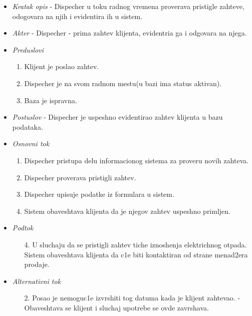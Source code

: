 \documentclass[10 pt]{article}
\begin{document}
		\begin{itemize}
			\item\textit{Kratak opis} - Dispecher u toku radnog vremena proverava pristigle zahteve, odogovara na njih i evidentira ih u sistem.
			
			\item\textit{Akter} - Dispecher - prima zahtev klijenta, evidentria ga i odgovara na njega.
			
			\item\textit{Preduslovi}
				\begin{enumerate}
					\item Klijent je poslao zahtev.
					\item Dispecher je na svom radnom mestu(u bazi ima status aktivan).
					\item Baza je ispravna.
				\end{enumerate} 
			
			\item\textit{Postuslov} - Dispecher je uspeshno evidentirao zahtev klijenta u bazu podataka.
			
			\item\textit{Osnovni tok}
				\begin{enumerate}
					\item Dispecher pristupa delu informacionog sistema za proveru novih zahteva.
					\item Dispecher proverava pristigli zahtev.
					\item Dispecher upisuje podatke iz formulara u sistem.
					\item Sistem obaveshtava klijenta da je njegov zahtev uspeshno primljen.
				\end{enumerate}
			
			\item\textit{Podtok}
				\begin{enumerate}
					\item [4.] U sluchaju da se pristigli zahtev tiche iznoshenja elektrichnog otpada. Sistem obaveshtava klijenta da c1e biti kontaktiran od strane menad2era prodaje.
				\end{enumerate}
			
			\item\textit{Alternativni tok}
				\begin{enumerate}
					\item [2.] Posao je nemoguc1e izvrshiti tog datuma kada je klijent zahtevao. - Obaveshtava se klijent i sluchaj upotrebe se ovde zavrshava.
				\end{enumerate}
		\end{itemize}
	
\end{document}
